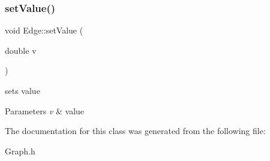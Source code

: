 \subsubsection{\texorpdfstring{set\+Value()}{setValue()}}
{\footnotesize\ttfamily void Edge\+::set\+Value (\begin{DoxyParamCaption}\item[{double}]{v }\end{DoxyParamCaption})\hspace{0.3cm}{\ttfamily [inline]}}



sets value 


\begin{DoxyParams}{Parameters}
{\em v} & value \\
\hline
\end{DoxyParams}


The documentation for this class was generated from the following file\+:\begin{DoxyCompactItemize}
\item 
Graph.\+h\end{DoxyCompactItemize}
